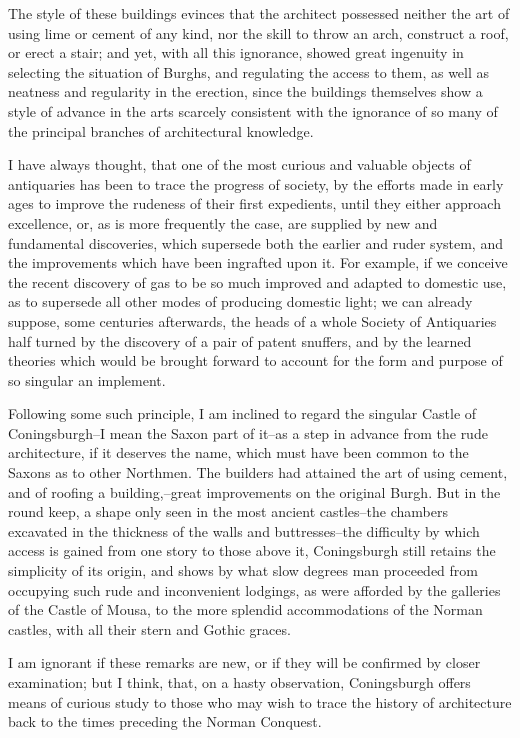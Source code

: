 The style of these buildings evinces that the architect possessed
neither the art of using lime or cement of any kind, nor the skill to
throw an arch, construct a roof, or erect a stair; and yet, with all
this ignorance, showed great ingenuity in selecting the situation of
Burghs, and regulating the access to them, as well as neatness and
regularity in the erection, since the buildings themselves show a style
of advance in the arts scarcely consistent with the ignorance of so many
of the principal branches of architectural knowledge.

I have always thought, that one of the most curious and valuable objects
of antiquaries has been to trace the progress of society, by the efforts
made in early ages to improve the rudeness of their first expedients,
until they either approach excellence, or, as is more frequently the
case, are supplied by new and fundamental discoveries, which supersede
both the earlier and ruder system, and the improvements which have been
ingrafted upon it. For example, if we conceive the recent discovery of
gas to be so much improved and adapted to domestic use, as to supersede
all other modes of producing domestic light; we can already suppose,
some centuries afterwards, the heads of a whole Society of Antiquaries
half turned by the discovery of a pair of patent snuffers, and by the
learned theories which would be brought forward to account for the form
and purpose of so singular an implement.

Following some such principle, I am inclined to regard the singular
Castle of Coningsburgh--I mean the Saxon part of it--as a step in
advance from the rude architecture, if it deserves the name, which must
have been common to the Saxons as to other Northmen. The builders had
attained the art of using cement, and of roofing a building,--great
improvements on the original Burgh. But in the round keep, a shape only
seen in the most ancient castles--the chambers excavated in the
thickness of the walls and buttresses--the difficulty by which access is
gained from one story to those above it, Coningsburgh still retains the
simplicity of its origin, and shows by what slow degrees man proceeded
from occupying such rude and inconvenient lodgings, as were afforded by
the galleries of the Castle of Mousa, to the more splendid
accommodations of the Norman castles, with all their stern and Gothic
graces.

I am ignorant if these remarks are new, or if they will be confirmed by
closer examination; but I think, that, on a hasty observation,
Coningsburgh offers means of curious study to those who may wish to
trace the history of architecture back to the times preceding the Norman
Conquest.

